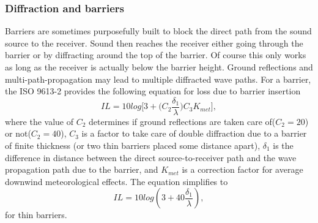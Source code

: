 \subsubsection{Diffraction and barriers}
Barriers are sometimes purposefully built to block the direct path from the sound source to the receiver. Sound then reaches the receiver either going through the barrier or by diffracting around the top of the barrier. Of course this only works as long as the receiver is actually below the barrier height. Ground reflections and multi-path-propagation may lead to multiple diffracted wave paths. For a barrier, the ISO 9613-2 \cite{ISO9613} provides the following equation for loss due to barrier insertion
\begin{equation}
    IL = 10log\bigg[3+\bigg(C_2\frac{\delta_1}{\lambda}\bigg)C_3K_{met}\bigg],
\end{equation}
where the value of $C_2$ determines if ground reflections are taken care of($C_2 = 20$) or not($C_2 = 40$), $C_3$ is a factor to take care of double diffraction due to a barrier of finite thickness (or two thin barriers placed some distance apart), $\delta_1$ is the difference in distance between the direct source-to-receiver path and the wave propagation path due to the barrier, and $K_{met}$ is a correction factor for average downwind meteorological effects. The equation simplifies to 
\begin{equation}
    IL = 10log(3+40\frac{\delta_1}{\lambda}), 
\end{equation}
for thin barriers.